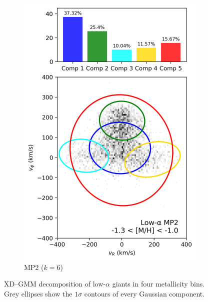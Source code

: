 \documentclass[a4paper,12pt]{article}
\begin{document}
\begin{figure}[H]
\begin{subfigure}{0.24\linewidth}
    \includegraphics[width=\linewidth]{../figures/gmm_mp2_low_alpha_k6.png}
    \caption{MP2 ($k{=}6$)}
    \label{fig:gmm_mp2_lo}
  \end{subfigure}

  \caption{XD–GMM decomposition of low-$\alpha$ giants in four metallicity
           bins.  Grey ellipses show the $1\sigma$ contours of every Gaussian component.}
  \label{fig:gmm_lowalpha_panel}
\end{figure}
\end{document}
